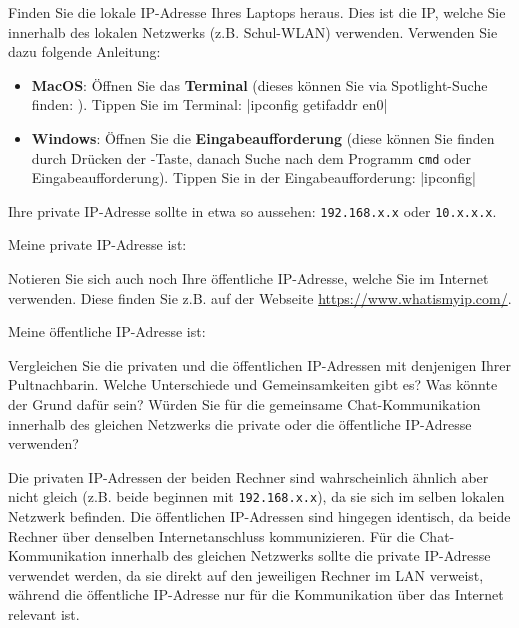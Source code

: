 \begin{myexercise}
    Finden Sie die lokale \gls{IP}-Adresse Ihres Laptops heraus. Dies ist die \gls{IP}, welche Sie innerhalb des lokalen Netzwerks (z.B. Schul-WLAN) verwenden. Verwenden Sie dazu folgende Anleitung:
    \begin{itemize}
        \item[\faApple] \textbf{MacOS}: Öffnen Sie das \textbf{Terminal} (dieses können Sie via Spotlight-Suche finden: \keys{\cmd + \SPACE}). Tippen Sie im Terminal: \commandbox*|ipconfig getifaddr en0|
        \item[\faWindows] \textbf{Windows}: Öffnen Sie die \textbf{Eingabeaufforderung} (diese können Sie finden durch Drücken der \keys{\faWindows}-Taste, danach Suche nach dem Programm \texttt{cmd} oder Eingabeaufforderung). Tippen Sie in der Eingabeaufforderung: \commandbox*|ipconfig|
    \end{itemize}

    Ihre private \gls{IP}-Adresse sollte in etwa so aussehen: \texttt{192.168.x.x} oder \texttt{10.x.x.x}.

    Meine private \gls{IP}-Adresse ist: \ipPlaceHolder

    Notieren Sie sich auch noch Ihre öffentliche \gls{IP}-Adresse, welche Sie im Internet verwenden. Diese finden Sie z.B. auf der Webseite \url{https://www.whatismyip.com/}.

    Meine öffentliche \gls{IP}-Adresse ist: \ipPlaceHolder
\end{myexercise}

\begin{myexercise}
    Vergleichen Sie die privaten und die öffentlichen \gls{IP}-Adressen mit denjenigen Ihrer Pultnachbarin. Welche Unterschiede und Gemeinsamkeiten gibt es? Was könnte der Grund dafür sein? Würden Sie für die gemeinsame Chat-Kommunikation innerhalb des gleichen Netzwerks die private oder die öffentliche \gls{IP}-Adresse verwenden?

    \begin{myanswer}
        Die privaten \gls{IP}-Adressen der beiden Rechner sind wahrscheinlich ähnlich aber nicht gleich (z.B. beide beginnen mit \texttt{192.168.x.x}), da sie sich im selben lokalen Netzwerk befinden. Die öffentlichen \gls{IP}-Adressen sind hingegen identisch, da beide Rechner über denselben Internetanschluss kommunizieren. Für die Chat-Kommunikation innerhalb des gleichen Netzwerks sollte die private \gls{IP}-Adresse verwendet werden, da sie direkt auf den jeweiligen Rechner im \gls{LAN} verweist, während die öffentliche \gls{IP}-Adresse nur für die Kommunikation über das Internet relevant ist.
    \end{myanswer}
\end{myexercise}

